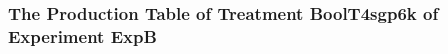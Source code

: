 \begin{frame}
 \fontsize{8pt}{9pt}\selectfont
 \frametitle{ The Production Table of Treatment BoolT4sgp6k of Experiment ExpB }

 \label{ExpBGrammarTable033.tex}  
 \end{frame}

